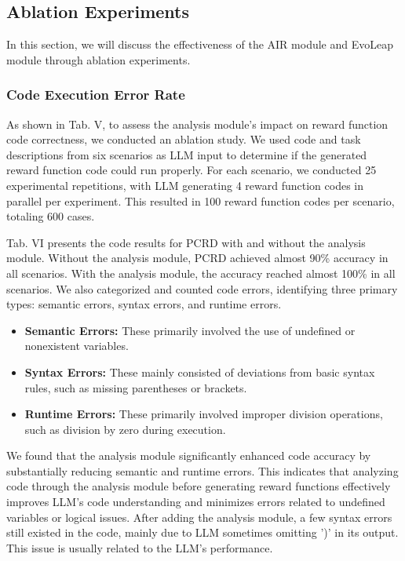 \documentclass[lettersize,journal]{IEEEtran}
\begin{document}
\subsection{Ablation Experiments}
In this section, we will discuss the effectiveness of the AIR module and EvoLeap module through ablation experiments.

\subsubsection{Code Execution Error Rate}
As shown in Tab. V, to assess the analysis module's impact on reward function code correctness, we conducted an ablation study. 
We used code and task descriptions from six scenarios as LLM input to determine if the generated reward function code could run properly. 
For each scenario, we conducted 25 experimental repetitions, with LLM generating 4 reward function codes in parallel per experiment. 
This resulted in 100 reward function codes per scenario, totaling 600 cases.



Tab. VI presents the code results for PCRD with and without the analysis module. Without the analysis module, PCRD achieved almost 90\% accuracy in all scenarios. 
With the analysis module, the accuracy reached almost 100\% in all scenarios. 
We also categorized and counted code errors, identifying three primary types: semantic errors, syntax errors, and runtime errors.
\begin{itemize}
    \item \textbf{Semantic Errors:} These primarily involved the use of undefined or nonexistent variables.
    \item \textbf{Syntax Errors:} These mainly consisted of deviations from basic syntax rules, such as missing parentheses or brackets.
    \item \textbf{Runtime Errors:} These primarily involved improper division operations, such as division by zero during execution.
\end{itemize}
We found that the analysis module significantly enhanced code accuracy by substantially reducing semantic and runtime errors. This indicates that analyzing code through the analysis module before generating reward functions effectively improves LLM's code understanding and minimizes errors related to undefined variables or logical issues. 
After adding the analysis module, a few syntax errors still existed in the code, mainly due to LLM sometimes omitting ')' in its output. 
This issue is usually related to the LLM's performance.
\end{document}

